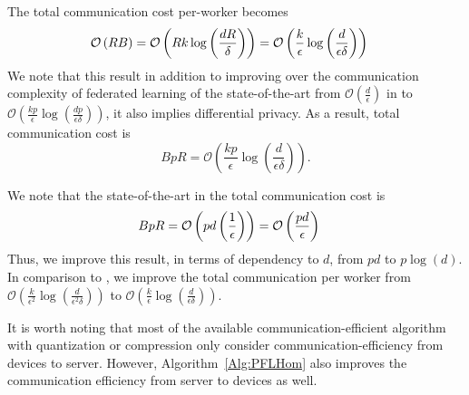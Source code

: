 \documentclass[review,onefignum,onetabnum]{siamart190516}
\begin{document}
\begin{corollary}
The total communication cost per-worker becomes 
\begin{align}\notag
\mathcal{O}\left(RB\right)&=\mathcal{O}\left(Rk\log \left(\frac{d R}{\delta}\right)\right)=\mathcal{O}\left(\frac{k }{\epsilon}\log \left(\frac{d }{\epsilon\delta}\right)\right)
\end{align}
We note that this result in addition to improving over the communication complexity of federated learning of the state-of-the-art from $\mathcal{O}\left(\frac{d}{\epsilon}\right)$ in \cite{karimireddy2019scaffold,wang2018cooperative,liang2019variance} to $\mathcal{O}\left(\frac{k p}{\epsilon}\log \left(\frac{d p}{\epsilon\delta}\right)\right)$, it also implies differential privacy. As a result, total communication cost is 
$$BpR=\mathcal{O}\left(\frac{k p}{\epsilon}\log \left(\frac{d }{\epsilon\delta}\right)\right).$$ 

We note that the state-of-the-art in \cite{karimireddy2019scaffold} the total communication cost is 
\begin{align}\notag
    BpR&=\mathcal{O}\left(pd\left(\frac{1}{\epsilon}\right) \right)=\mathcal{O}\left(\frac{pd}{\epsilon}\right) 
\end{align}
Thus, we improve this result, in terms of dependency to $d$, from $pd$ to $p\log(d)$.
In comparison to \cite{ivkin2019communication}, we improve the total communication per worker from $\mathcal{O}\left(\frac{k }{\epsilon^2}\log \left(\frac{d }{\epsilon^2\delta}\right)\right)$ to $\mathcal{O}\left(\frac{k }{\epsilon}\log \left(\frac{d }{\epsilon\delta}\right)\right)$.
\end{corollary}

\begin{remark}
It is worth noting that most of the available communication-efficient algorithm with quantization or compression only consider communication-efficiency from devices to server. However, Algorithm~\ref{Alg:PFLHom} also improves the communication efficiency from server to devices as well. 
\end{remark}
\end{document}

